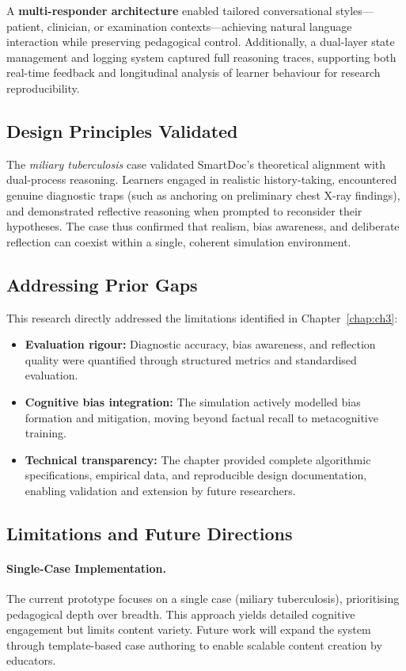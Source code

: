 A \textbf{multi-responder architecture} enabled tailored conversational styles—patient, clinician, or examination contexts—achieving natural language interaction while preserving pedagogical control. Additionally, a dual-layer state management and logging system captured full reasoning traces, supporting both real-time feedback and longitudinal analysis of learner behaviour for research reproducibility.

\subsection{Design Principles Validated}
The \textit{miliary tuberculosis} case validated SmartDoc’s theoretical alignment with dual-process reasoning. Learners engaged in realistic history-taking, encountered genuine diagnostic traps (such as anchoring on preliminary chest X-ray findings), and demonstrated reflective reasoning when prompted to reconsider their hypotheses. The case thus confirmed that realism, bias awareness, and deliberate reflection can coexist within a single, coherent simulation environment.

\subsection{Addressing Prior Gaps}
This research directly addressed the limitations identified in Chapter~\ref{chap:ch3}:

\begin{itemize}
    \item \textbf{Evaluation rigour:} Diagnostic accuracy, bias awareness, and reflection quality were quantified through structured metrics and standardised evaluation.
    \item \textbf{Cognitive bias integration:} The simulation actively modelled bias formation and mitigation, moving beyond factual recall to metacognitive training.
    \item \textbf{Technical transparency:} The chapter provided complete algorithmic specifications, empirical data, and reproducible design documentation, enabling validation and extension by future researchers.
\end{itemize}

\subsection{Limitations and Future Directions}

\paragraph{Single-Case Implementation.}
The current prototype focuses on a single case (miliary tuberculosis), prioritising pedagogical depth over breadth. This approach yields detailed cognitive engagement but limits content variety. Future work will expand the system through template-based case authoring to enable scalable content creation by educators.

